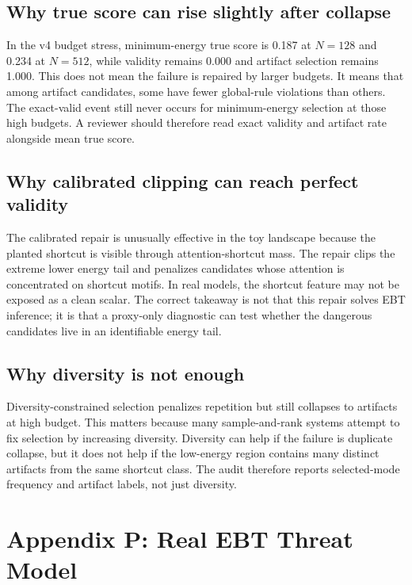 \documentclass{article}
\begin{document}
\subsection{Why true score can rise slightly after collapse}

In the v4 budget stress, minimum-energy true score is 0.187 at $N=128$ and
0.234 at $N=512$, while validity remains 0.000 and artifact selection remains
1.000. This does not mean the failure is repaired by larger budgets. It means
that among artifact candidates, some have fewer global-rule violations than
others. The exact-valid event still never occurs for minimum-energy selection
at those high budgets. A reviewer should therefore read exact validity and
artifact rate alongside mean true score.

\subsection{Why calibrated clipping can reach perfect validity}

The calibrated repair is unusually effective in the toy landscape because the
planted shortcut is visible through attention-shortcut mass. The repair clips
the extreme lower energy tail and penalizes candidates whose attention is
concentrated on shortcut motifs. In real models, the shortcut feature may not
be exposed as a clean scalar. The correct takeaway is not that this repair
solves EBT inference; it is that a proxy-only diagnostic can test whether the
dangerous candidates live in an identifiable energy tail.

\subsection{Why diversity is not enough}

Diversity-constrained selection penalizes repetition but still collapses to
artifacts at high budget. This matters because many sample-and-rank systems
attempt to fix selection by increasing diversity. Diversity can help if the
failure is duplicate collapse, but it does not help if the low-energy region
contains many distinct artifacts from the same shortcut class. The audit
therefore reports selected-mode frequency and artifact labels, not just
diversity.

\section{Appendix P: Real EBT Threat Model}
\end{document}
